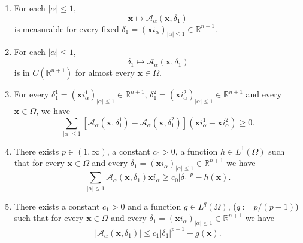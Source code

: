 \begin{enumerate}[label=H-\arabic*.,ref=H-\arabic*]\item\label{hyp:monotone-pde-measurability} For each $|\alpha|\leq1$,
\begin{equation}\label{eq:monotone-pde-coefficient-measurability}
\bm{x}\mapsto\mathcal{A}_\alpha(\bm{x},\delta_1)
\end{equation}
is measurable for every fixed $\delta_1=(\bm{x}i_\alpha)_{|\alpha|\leq1}\in\mathbb{R}^{n+1}$.

\item\label{hyp:monotone-pde-continuity} For each $|\alpha|\leq1$,
\begin{equation}\label{eq:monotone-pde-coefficient-jet-continuity}
\delta_1\mapsto\mathcal{A}_\alpha(\bm{x},\delta_1)
\end{equation}
is in $C(\mathbb{R}^{n+1})$ for almost every $\bm{x}\in\Omega$.

\item\label{hyp:monotone-pde-monotonicity} For every $\delta_1^1=(\bm{x}i_\alpha^1)_{|\alpha|\leq1}\in\mathbb{R}^{n+1}$, $\delta_1^2=(\bm{x}i_\alpha^2)_{|\alpha|\leq1}\in\mathbb{R}^{n+1}$ and every $\bm{x}\in\Omega$, we have
\begin{equation}\label{eq:monotone-pde-coefficient-monotonicity}
\sum_{|\alpha|\leq1}[\mathcal{A}_\alpha(\bm{x},\delta_1^1)-\mathcal{A}_\alpha(\bm{x},\delta_1^2)](\bm{x}i_\alpha^1-\bm{x}i_\alpha^2)\geq0.
\end{equation}


\item\label{hyp:monotone-pde-coercivity} There exists $p\in(1,\infty)$, a constant $c_0>0$, a function $h\in L^1(\Omega)$ such that for every $\bm{x}\in\Omega$ and every $\delta_1=(\bm{x}i_\alpha)_{|\alpha|\leq1}\in\mathbb{R}^{n+1}$ we have
\begin{equation}\label{eq:monotone-pde-coefficient-coercivity}
\sum_{|\alpha|\leq1}\mathcal{A}_\alpha(\bm{x},\delta_1)\bm{x}i_\alpha\geq c_0|\delta_1|^p-h(\bm{x}).
\end{equation}


\item\label{hyp:monotone-pde-growth} There exists a constant $c_1>0$ and a function $g\in L^q(\Omega)$, ($q:=p/(p-1)$) such that for every $\bm{x}\in\Omega$ and every $\delta_1=(\bm{x}i_\alpha)_{|\alpha|\leq1}\in\mathbb{R}^{n+1}$ we have
\begin{equation}\label{eq:monotone-pde-coefficient-growth-bound}
|\mathcal{A}_\alpha(\bm{x},\delta_1)|\leq c_1|\delta_1|^{p-1}+g(\bm{x}).
\end{equation}
\end{enumerate}

